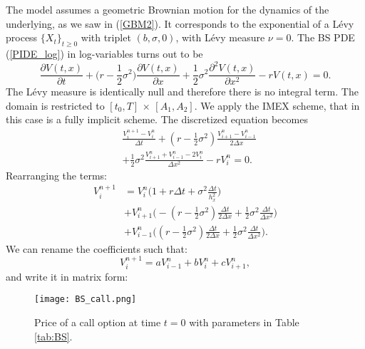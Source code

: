 The \cite{BS73} model assumes a geometric Brownian motion for the dynamics of the underlying, as we saw in (\ref{GBM2}).
It corresponds to the exponential of a Lévy process $\{X_t\}_{t\geq 0}$ with triplet $(b,\sigma,0)$, with Lévy measure $\nu = 0$.
The BS PDE (\ref{PIDE_log}) in log-variables turns out to be
\begin{equation}\label{BS_PDE}
\frac{\partial  V(t,x)}{\partial t}  
          + \biggl( r -\frac{1}{2}\sigma^2 \biggr) \frac{\partial V(t,x)}{\partial x}
          + \frac{1}{2} \sigma^2 \frac{\partial^2  V(t,x)}{\partial x^2} - r  V(t,x)  = 0.
\end{equation}
The Lévy measure is identically null and therefore there is no integral term.
The domain is restricted to $[t_0,T]\, \times \, [A_1,A_2]$. We apply the IMEX scheme, that in this case is a fully implicit scheme.  
The discretized equation becomes
\begin{align}
&\frac{V^{n+1}_{i} -V^{n}_{i}}{\Delta t} + 
(r-\frac{1}{2}\sigma^2) \frac{V^{n}_{i+1} -V^{n}_{i-1}}{ 2 \Delta x} \\ \nonumber
&+ \frac{1}{2} \sigma^2 \frac{V^{n}_{i+1} + V^{n}_{i-1} - 2 V^{n}_{i}}{\Delta x^2}  - r V^{n}_i = 0.
\end{align}
Rearranging the terms: 
\begin{align*}
 V^{n+1}_{i} &= V^{n}_{i} \biggl( 1 + r\Delta t + \sigma^2 \frac{\Delta t}{h_x^2} \biggr)  \\
& + V^{n}_{i+1} \biggl( -(r -\frac{1}{2}\sigma^2)\frac{\Delta t}{2 \Delta x} +
\frac{1}{2}\sigma^2 \frac{\Delta t}{\Delta x^2}  \biggr)  \\
& + V^{n}_{i-1} \biggl( (r -\frac{1}{2}\sigma^2)\frac{\Delta t}{2 \Delta x} + 
\frac{1}{2}\sigma^2 \frac{\Delta t}{\Delta x^2}  \biggr).
\end{align*}
We can rename the coefficients such that:
$$ V^{n+1}_{i} = a V^{n}_{i-1} + b V^{n}_{i} + c V^{n}_{i+1}, $$
and write it in matrix form:
\begin{figure}[t]
   \centering
   \texttt{[image: BS\_call.png]}
   \caption{Price of a call option at time $t=0$ with parameters in Table \ref{tab:BS}.}
   \label{BS_call}
\end{figure}  
